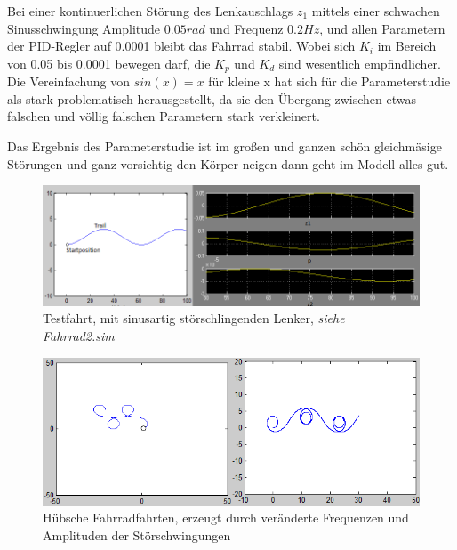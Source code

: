 \documentclass[a4paper]{article}
\begin{document}
Bei einer kontinuerlichen Störung des Lenkauschlags $z_1$ mittels einer schwachen Sinusschwingung Amplitude $0.05 rad$ und Frequenz $0.2 Hz$, und allen Parametern der PID-Regler auf 0.0001 bleibt das Fahrrad stabil.
Wobei sich $K_i$ im Bereich von 0.05 bis 0.0001 bewegen darf, die $K_p$ und $K_d$ sind wesentlich empfindlicher.
Die Vereinfachung von $sin(x) = x$ für kleine x hat sich für die Parameterstudie als stark problematisch herausgestellt, da sie den Übergang zwischen etwas falschen und völlig falschen Parametern stark verkleinert.

Das Ergebnis des Parameterstudie ist im großen und ganzen sch\"on gleichm\"asige St\"orungen und ganz vorsichtig den K\"orper neigen dann geht im Modell alles gut.

\begin{figure}[ht!]
    \centering
    \includegraphics[width=\linewidth]{erg_bsp3.png}
    \caption{Testfahrt, mit sinusartig st\"orschlingenden Lenker, \textit{siehe Fahrrad2.sim}}
    \label{fig:bsp3}
\end{figure}


\begin{figure}[ht!]
    \centering
    \includegraphics[width=\linewidth]{bsp3_goof.png}
    \caption{H\"ubsche Fahrradfahrten, erzeugt durch veränderte Frequenzen und Amplituden der Störschwingungen}
    \label{fig:bsp3goof}
\end{figure}
\end{document}
